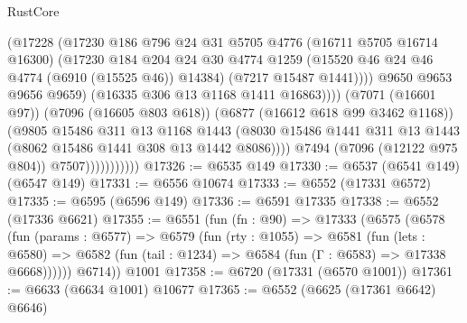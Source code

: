 \begin{lexlean}{RustCore}
\begin{coremodule}
                                    (@17228
                                      (@17230
                                        @186
                                        @796
                                        @24
                                        @31
                                        @5705
                                        @4776
                                        (@16711 @5705 @16714 @16300)
                                        (@17230
                                          @184
                                          @204
                                          @24
                                          @30
                                          @4774
                                          @1259
                                          (@15520 @46 @24 @46 @4774 (@6910 (@15525 @46)) @14384)
                                          (@7217 @15487 @1441))))
                                    @9650
                                    @9653
                                    @9656
                                    @9659)
                                  (@16335 @306 @13 @1168 @1411 @16863))))
                            (@7071 (@16601 @97))
                            (@7096 (@16605 @803 @618))
                            (@6877 (@16612 @618 @99 @3462 @1168))
                            (@9805
                              @15486
                              @311
                              @13
                              @1168
                              @1443
                              (@8030
                                @15486
                                @1441
                                @311
                                @13
                                @1443
                                (@8062 @15486 @1441 @308 @13 @1442 @8086))))
                          @7494
                          (@7096 (@12122 @975 @804))
                          @7507)))))))))))
@17326 := @6535 @149
@17330 := @6537 (@6541 @149) (@6547 @149)
@17331 := @6556 @10674
@17333 := @6552 (@17331 @6572)
@17335 := @6595 (@6596 @149)
@17336 := @6591 @17335
@17338 := @6552 (@17336 @6621)
@17355 := @6551
    (fun (fn : @90) =>
    @17333
      (@6575
        (@6578
          (fun (params : @6577) =>
          @6579
            (fun (rty : @1055) =>
            @6581
              (fun (lets : @6580) =>
              @6582 (fun (tail : @1234) => @6584 (fun (Γ : @6583) => @17338 @6668))))))
        @6714))
    @1001
@17358 := @6720 (@17331 (@6570 @1001))
@17361 := @6633 (@6634 @1001) @10677
@17365 := @6552 (@6625 (@17361 @6642) @6646)

\end{coremodule}
\end{lexlean}
